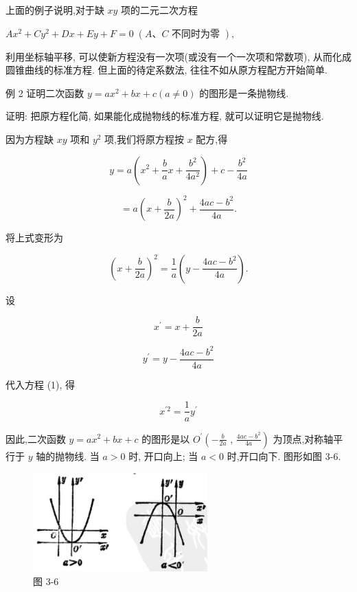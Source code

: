 \documentclass[lang=cn,newtx,10pt,scheme=chinese]{elegantbook}
\begin{document}
上面的例子说明,对于缺 \({xy}\) 项的二元二次方程

\(A{x}^{2} + C{y}^{2} + {Dx} + {Ey} + F = 0\;\left( {A\text{、}C\text{ 不同时为零 }}\right) ,\)

利用坐标轴平移, 可以使新方程没有一次项(或没有一个一次项和常数项), 从而化成圆锥曲线的标准方程. 但上面的待定系数法, 往往不如从原方程配方开始简单.

例 2 证明二次函数 \(y = a{x}^{2} + {bx} + c\left( {a \neq 0}\right)\) 的图形是一条抛物线.

证明: 把原方程化简, 如果能化成抛物线的标准方程, 就可以证明它是抛物线.

因为方程缺 \({xy}\) 项和 \({y}^{2}\) 项,我们将原方程按 \(x\) 配方,得

\[
  y = a\left( {{x}^{2} + \frac{b}{a}x + \frac{{b}^{2}}{4{a}^{2}}}\right) + c - \frac{{b}^{2}}{4a}
\]

\[
  = a{\left( x + \frac{b}{2a}\right) }^{2} + \frac{{4ac} - {b}^{2}}{4a}.
\]

将上式变形为

\[
    {\left( x + \frac{b}{2a}\right) }^{2} = \frac{1}{a}\left( {y - \frac{{4ac} - {b}^{2}}{4a}}\right) . \tag{1}
\]

设

\[
    {x}^{\prime } = x + \frac{b}{2a}
\]

\[
    {y}^{\prime } = y - \frac{{4ac} - {b}^{2}}{4a}
\]

代入方程 (1), 得

\[
    {x}^{\prime 2} = \frac{1}{a}{y}^{\prime }
\]

因此,二次函数 \(y = a{x}^{2} + {bx} + c\) 的图形是以 \({O}^{\prime }\left( {-\frac{b}{2a}}\right.\) , \(\left. \frac{{4ac} - {b}^{2}}{4a}\right)\) 为顶点,对称轴平行于 \(y\) 轴的抛物线. 当 \(a > 0\) 时, 开口向上; 当 \(a < 0\) 时,开口向下. 图形如图 3-6.

\begin{figure}[h]
  \centering
  \includegraphics[max width=0.6\textwidth]{images/01912cc2-ffb6-728e-9ae7-b113ff05c64b_137_787676.jpg}
  \caption{图 3-6}
\end{figure}
\end{document}
